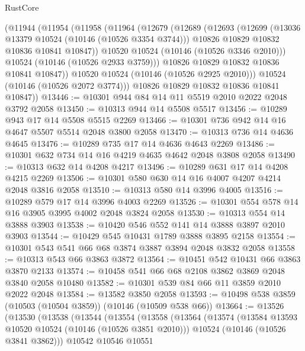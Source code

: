 \begin{lexlean}{RustCore}
\begin{coremodule}
        (@11944
          (@11954
            (@11958
              (@11964
                (@12679
                  (@12689
                    (@12693
                      (@12699
                        (@13036 @13379 @10524 (@10146 (@10526 @3354 @3744)))
                        @10826
                        @10829
                        @10832
                        @10836
                        @10841
                        @10847))
                    @10520
                    @10524
                    (@10146 (@10526 @3346 @2010)))
                  @10524
                  (@10146 (@10526 @2933 @3759)))
                @10826
                @10829
                @10832
                @10836
                @10841
                @10847))
            @10520
            @10524
            (@10146 (@10526 @2925 @2010)))
          @10524
          (@10146 (@10526 @2072 @3774)))
        @10826
        @10829
        @10832
        @10836
        @10841
        @10847))
@13446 := @10301 @944 @84 @14 @11 @5519 @2010 @2022 @2048 @3792 @2058
@13450 := @10313 @944 @14 @5508 @5517
@13456 := @10289 @943 @17 @14 @5508 @5515 @2269
@13466 := @10301 @736 @942 @14 @16 @4647 @5507 @5514 @2048 @3800 @2058
@13470 := @10313 @736 @14 @4636 @4645
@13476 := @10289 @735 @17 @14 @4636 @4643 @2269
@13486 := @10301 @632 @734 @14 @16 @4219 @4635 @4642 @2048 @3808 @2058
@13490 := @10313 @632 @14 @4208 @4217
@13496 := @10289 @631 @17 @14 @4208 @4215 @2269
@13506 := @10301 @580 @630 @14 @16 @4007 @4207 @4214 @2048 @3816 @2058
@13510 := @10313 @580 @14 @3996 @4005
@13516 := @10289 @579 @17 @14 @3996 @4003 @2269
@13526 := @10301 @554 @578 @14 @16 @3905 @3995 @4002 @2048 @3824 @2058
@13530 := @10313 @554 @14 @3888 @3903
@13538 := @10420 @546 @552 @141 @14 @3888 @3897 @2010 @3903
@13544 := @10429 @545 @10431 @1789 @3888 @3895 @2158
@13554 := @10301 @543 @541 @66 @68 @3874 @3887 @3894 @2048 @3832 @2058
@13558 := @10313 @543 @66 @3863 @3872
@13564 := @10451 @542 @10431 @66 @3863 @3870 @2133
@13574 := @10458 @541 @66 @68 @2108 @3862 @3869 @2048 @3840 @2058 @10480
@13582 := @10301 @539 @84 @66 @11 @3859 @2010 @2022 @2048
@13584 := @13582 @3850 @2058
@13593 := @10498 @538 @3859 (@10503 (@10504 @3859)) (@10146 (@10509 @538 @66))
@13664 := @13526
    (@13530
      (@13538
        (@13544
          (@13554
            (@13558
              (@13564
                (@13574
                  (@13584 @13593 @10520 @10524 (@10146 (@10526 @3851 @2010)))
                  @10524
                  (@10146 (@10526 @3841 @3862)))
                @10542
                @10546
                @10551

\end{coremodule}
\end{lexlean}

